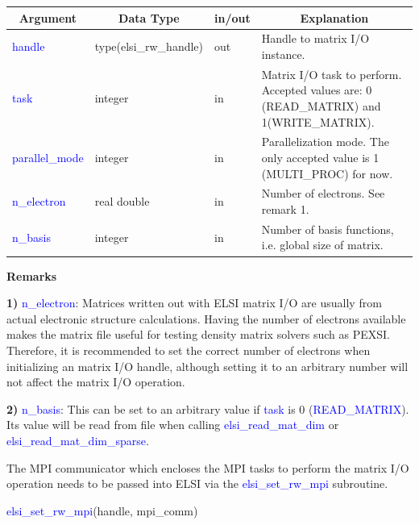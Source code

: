 \documentclass{report}
\begin{document}
\begin{tabular}[]{|p{20mm}|p{45mm}|p{15mm}|p{85mm}|}
\hline
\multicolumn{1}{|c|}{\textbf{Argument}} & \multicolumn{1}{c|}{\textbf{Data Type}} & \multicolumn{1}{c|}{\textbf{in/out}} & \multicolumn{1}{c|}{\textbf{Explanation}}\\
\hline
\textcolor{blue}{handle}         & type(elsi\_rw\_handle) & out & Handle to matrix I/O instance.\\
\hline
\textcolor{blue}{task}           & integer                & in  & Matrix I/O task to perform.  Accepted values are:  0 (READ\_MATRIX) and 1(WRITE\_MATRIX).\\
\hline
\textcolor{blue}{parallel\_mode} & integer                & in  & Parallelization mode.  The only accepted value is 1 (MULTI\_PROC) for now.\\
\hline
\textcolor{blue}{n\_electron}    & real double            & in  & Number of electrons.  See remark 1.\\
\hline
\textcolor{blue}{n\_basis}       & integer                & in  & Number of basis functions, i.e. global size of matrix.\\
\hline
\end{tabular}

\textbf{Remarks}

\textbf{1)} \textcolor{blue}{n\_electron}:  Matrices written out with ELSI matrix I/O are usually from actual electronic structure calculations.  Having the number of electrons available makes the matrix file useful for testing density matrix solvers such as PEXSI.  Therefore, it is recommended to set the correct number of electrons when initializing an matrix I/O handle, although setting it to an arbitrary number will not affect the matrix I/O operation.

\textbf{2)} \textcolor{blue}{n\_basis}:  This can be set to an arbitrary value if \textcolor{blue}{task} is 0 (\textcolor{blue}{READ\_MATRIX}).  Its value will be read from file when calling \textcolor{blue}{elsi\_read\_mat\_dim} or \textcolor{blue}{elsi\_read\_mat\_dim\_sparse}.

The MPI communicator which encloses the MPI tasks to perform the matrix I/O operation needs to be passed into ELSI via the \textcolor{blue}{elsi\_set\_rw\_mpi} subroutine.

\begin{labeling}{\hspace{6cm}}
\item [\hspace{0.3cm} \textcolor{blue}{elsi\_set\_rw\_mpi}(handle, mpi\_comm)]
\end{labeling}
\end{document}
